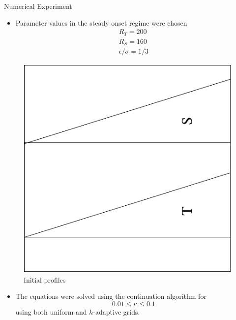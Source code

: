 \documentclass[compress,12pt]{beamer}
\begin{document}
\begin{frame}{Numerical Experiment}
  \begin{minipage}[h]{.45\textwidth}
    \begin{itemize}
    \item Parameter values in the steady onset regime were chosen
      \begin{eqnarray}
	\nonumber
	R_T=200 \\%
	\nonumber
	R_S=160 \\%
	\nonumber
	\epsilon / \sigma = 1/3
      \end{eqnarray}
    \end{itemize}
  \end{minipage}
  \begin{minipage}[h]{.45\textwidth}
    \begin{figure}
      \begin{center}
      \includegraphics[height=.35\textheight,angle=-90]{figures/initial_profile2}
      \caption{Initial profiles}
      \end{center}
    \end{figure}
  \end{minipage}

  \begin{itemize}
    \item The equations were solved using the continuation algorithm
      for 
      \begin{equation}
	\nonumber
	0.01 \leq \kappa \leq 0.1
      \end{equation}
      using both uniform and $h$-adaptive grids.

  \end{itemize}
\end{frame}
\end{document}

